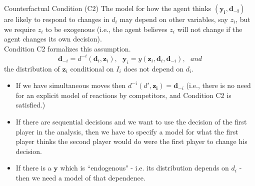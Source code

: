 \documentclass[aspectratio=169,11pt]{beamer}
\begin{document}
\begin{frame}{Counterfactual Condition (C2)}
\footnotesize
The model for how the agent thinks $(\symbf{y_i, d_{-i}})$ are likely to
respond to changes in $d_i$ may depend on other variables, say $z_i$, but we require $z_i$ to be exogenous (i.e., the agent believes $z_i$ will not change if the agent changes its own
decision). \\ \vspace{0.2in}
\noindent Condition C2 formalizes this assumption.
\begin{equation*}
\symbf{d}_{-i}=d^{-i}(\symbf{d}_{i},\symbf{z}_{i}),\text{ \ }\symbf{y}%
_{i}=y(\symbf{z}_{i},\symbf{d}_{i},\symbf{d}_{-i}),\text{ }and
\end{equation*}
the distribution of $\symbf{z}_{i}$ conditional on $\mathit{I}_{i}$ does
not depend on $d_{i}$.
\begin{itemize}
\item If we have simultaneous moves then $d^{-i}(d',\symbf{z_i}) = \symbf{d}_{-i}$ (i.e., there is no need for an explicit model of reactions by competitors, and Condition C2 is satisfied.)
\item If there are sequential decisions and we want to use the decision of the first player in the analysis,
then we have to specify a model for what the first player
thinks the second player would do were the first player to
change his decision.
\item If there is a $\symbf{y}$ which is ``endogenous" - i.e. its distribution depends on $d_{i}$ - then we
need a model of that dependence.
\end{itemize}
\end{frame}
\end{document}
